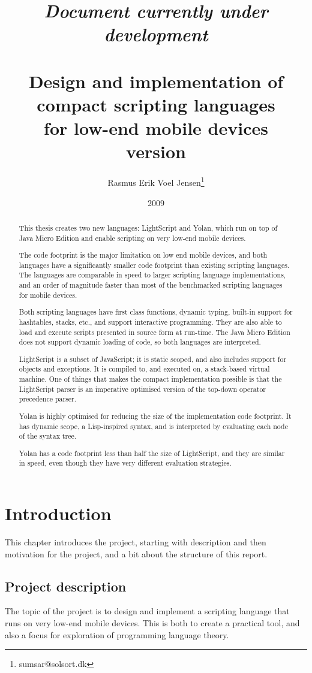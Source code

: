 \documentclass[11pt]{report}
\title{
\emph{Document currently under development} \\ ~ \\
Design and implementation of \\
compact scripting languages \\ 
for low-end mobile devices \\
{\scriptsize version }}
\author{
  Rasmus Erik Voel Jensen\footnote{
    sumsar@solsort.dk
  }
}
\date{2009}
\begin{document}
\maketitle
\begin{abstract}
This thesis creates two new languages: LightScript and Yolan, which run on top of Java Micro Edition and enable scripting on very low-end mobile devices.

The code footprint is the major limitation on low end mobile devices, and both languages have a significantly smaller code footprint than existing scripting languages. 
The languages are comparable in speed to larger scripting language implementations,
and an order of magnitude faster than most of the benchmarked scripting languages for mobile devices.

Both scripting languages have first class functions, dynamic typing, built-in support for hashtables, stacks, etc., and support interactive programming. They are also able to load and execute scripts presented in source form at run-time. 
The Java Micro Edition does not support dynamic loading of code, so both languages are interpreted.

LightScript is a subset of JavaScript; it is static scoped, and also includes support for objects and exceptions. It is compiled to, and executed on, a stack-based virtual machine. One of things that makes the compact implementation possible is that the LightScript parser is an imperative optimised version of the top-down operator precedence parser.

Yolan is highly optimised for reducing the size of the implementation code footprint. It has dynamic scope, a Lisp-inspired syntax, and is interpreted by evaluating each node of the syntax tree.

Yolan has a code footprint less than half the size of LightScript, and they are similar in speed, even though they have very different evaluation strategies.
\end{abstract}

\setcounter{tocdepth}{2}
\tableofcontents

\chapter{Introduction}
This chapter introduces the project, starting with description and then motivation for the project, and a bit about the structure of this report.

\section{Project description}
    The topic of the project is to design and implement a scripting language
that runs on very low-end mobile devices. This is both to create a practical tool, and
also a focus for exploration of programming language theory. 
\end{document}
